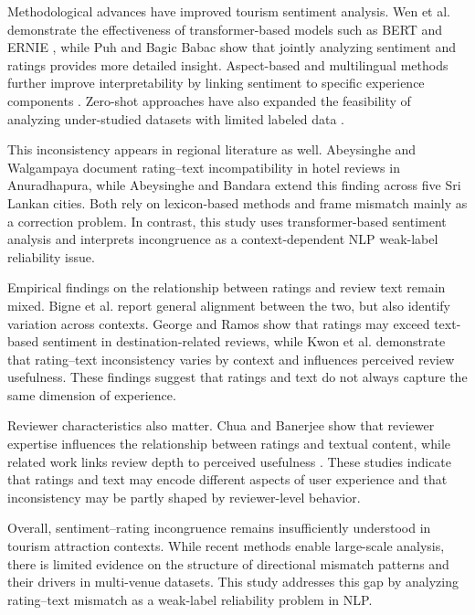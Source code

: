 \documentclass[conference]{IEEEtran}
\begin{document}
Methodological advances have improved tourism sentiment analysis.
Wen et al. \cite{Wen} demonstrate the effectiveness of transformer-based
models such as BERT \cite{Devlin} and ERNIE \cite{Sun}, while Puh and Bagic Babac \cite{Puh} show
that jointly analyzing sentiment and ratings provides more detailed insight.
Aspect-based and multilingual methods further improve
interpretability by linking sentiment to specific experience components
\cite{Chu2022,Ali}. Zero-shot approaches have also expanded the
feasibility of analyzing under-studied datasets with limited labeled data
\cite{Nawawi}.

This inconsistency appears in regional literature as well. Abeysinghe and Walgampaya \cite{walgampaya} document rating–text incompatibility in hotel reviews in Anuradhapura, while Abeysinghe and Bandara \cite{abeysinghe} extend this finding across five Sri Lankan cities. Both rely on lexicon-based methods and frame mismatch mainly as a correction problem. In contrast, this study uses transformer-based sentiment analysis and interprets incongruence as a context-dependent NLP weak-label reliability issue.

Empirical findings on the relationship between ratings and review text remain
mixed. Bigne et al. \cite{Bigne} report general alignment between the two, but also
identify variation across contexts. George and Ramos \cite{George} show that ratings may
exceed text-based sentiment in destination-related reviews, while Kwon et al.
\cite{Kwon} demonstrate that rating--text inconsistency varies by context and
influences perceived review usefulness. These findings suggest that ratings and
text do not always capture the same dimension of experience.

Reviewer characteristics also matter. Chua and Banerjee \cite{Chua} show that
reviewer expertise influences the relationship between ratings and textual
content, while related work links review depth to
perceived usefulness \cite{Chua,Ameur}. These studies indicate that
ratings and text may encode different aspects of user experience and that
inconsistency may be partly shaped by reviewer-level behavior.

Overall, sentiment–rating incongruence remains insufficiently understood in tourism attraction contexts. While recent methods enable large-scale analysis, there is limited evidence on the structure of directional mismatch patterns and their drivers in multi-venue datasets. This study addresses this gap by analyzing rating–text mismatch as a weak-label reliability problem in NLP.
\end{document}
